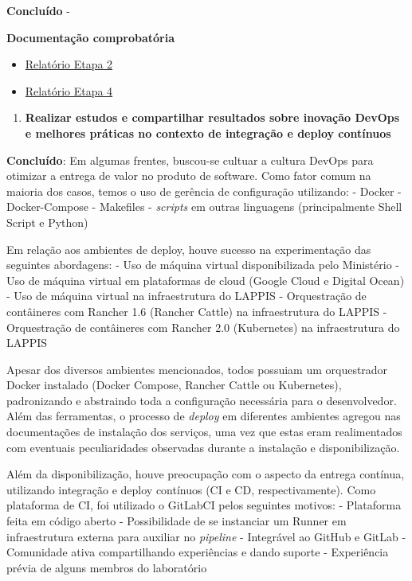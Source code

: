 \textbf{Concluído} -

\textbf{Documentação comprobatória}

\begin{itemize}
\item
  \href{https://github.com/lappis-unb/EcossistemasSWLivre/blob/master/Relatorios/R2/RELATÓRIO\%20ETAPA\%202.pdf}{Relatório
  Etapa 2}
\item
  \href{https://github.com/lappis-unb/EcossistemasSWLivre/blob/master/Relatorios/R4/RELATÓRIO\%20ETAPA\%204.pdf}{Relatório
  Etapa 4}
\end{itemize}

\begin{enumerate}
\def\labelenumi{\arabic{enumi}.}
\setcounter{enumi}{3}
\tightlist
\item
  \textbf{Realizar estudos e compartilhar resultados sobre inovação
  DevOps e melhores práticas no contexto de integração e deploy
  contínuos}
\end{enumerate}

\textbf{Concluído}: Em algumas frentes, buscou-se cultuar a cultura
DevOps para otimizar a entrega de valor no produto de software. Como
fator comum na maioria dos casos, temos o uso de gerência de
configuração utilizando: - Docker - Docker-Compose - Makefiles -
\emph{scripts} em outras linguagens (principalmente Shell Script e
Python)

Em relação aos ambientes de deploy, houve sucesso na experimentação das
seguintes abordagens: - Uso de máquina virtual disponibilizada pelo
Ministério - Uso de máquina virtual em plataformas de cloud (Google
Cloud e Digital Ocean) - Uso de máquina virtual na infraestrutura do
LAPPIS - Orquestração de contâineres com Rancher 1.6 (Rancher Cattle) na
infraestrutura do LAPPIS - Orquestração de contâineres com Rancher 2.0
(Kubernetes) na infraestrutura do LAPPIS

Apesar dos diversos ambientes mencionados, todos possuiam um
orquestrador Docker instalado (Docker Compose, Rancher Cattle ou
Kubernetes), padronizando e abstraindo toda a configuração necessária
para o desenvolvedor. Além das ferramentas, o processo de \emph{deploy}
em diferentes ambientes agregou nas documentações de instalação dos
serviços, uma vez que estas eram realimentados com eventuais
peculiaridades observadas durante a instalação e disponibilização.

Além da disponibilização, houve preocupação com o aspecto da entrega
contínua, utilizando integração e deploy contínuos (CI e CD,
respectivamente). Como plataforma de CI, foi utilizado o GitLabCI pelos
seguintes motivos: - Plataforma feita em código aberto - Possibilidade
de se instanciar um Runner em infraestrutura externa para auxiliar no
\emph{pipeline} - Integrável ao GitHub e GitLab - Comunidade ativa
compartilhando experiências e dando suporte - Experiência prévia de
alguns membros do laboratório

